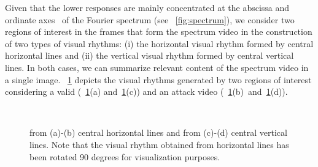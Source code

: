 \documentclass[journal]{IEEEtran}
\providecommand{\rv}[1]{{\protect\color{black}{#1}}}
\providecommand{\rrv}[1]{{\protect\color{black}{#1}}}
\begin{document}
Given that the lower responses are mainly concentrated at the abscissa and ordinate axes~\cite{Smith:SEG:1997} of the Fourier spectrum (see \rrv{Fig.}~\ref{fig:spectrum}), \rv{initially} we consider two regions of interest in the frames that form the spectrum video in the construction of two types of visual rhythms: (i) the horizontal visual rhythm formed by central horizontal lines and (ii) the vertical visual rhythm formed by central vertical lines. In both cases, we can summarize relevant content of the spectrum video in a single image. \rrv{Fig.}~\ref{fig:rv} depicts the visual rhythms generated by two regions of interest considering a valid (\rrv{Fig.}~\ref{fig:rv}(a) and~\ref{fig:rv}(c)) and an attack video (\rrv{Fig.}~\ref{fig:rv}(b)~and~\ref{fig:rv}(d)).
%
\begin{figure}[[!htb]
\centering
{}\hspace{1mm}
\\ 
\hspace{1mm}
\caption{\rv{Visual rhythms constructed} from (a)-(b) central horizontal lines and from (c)-(d) central vertical lines. Note that the visual rhythm obtained from horizontal lines has been rotated 90 degrees for {visualization purposes}.}
\label{fig:rv}
\end{figure}
\end{document}
